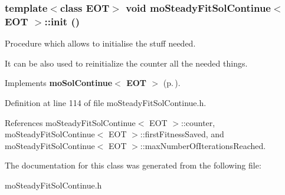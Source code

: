 \subsubsection{\setlength{\rightskip}{0pt plus 5cm}template$<$class EOT$>$ void {\bf mo\-Steady\-Fit\-Sol\-Continue}$<$ EOT $>$::init ()\hspace{0.3cm}{\tt  [inline, virtual]}}\label{classmo_steady_fit_sol_continue_a2}


Procedure which allows to initialise the stuff needed. 

It can be also used to reinitialize the counter all the needed things. 

Implements {\bf mo\-Sol\-Continue$<$ EOT $>$} {\rm (p.\,\pageref{classmo_sol_continue_a0})}.

Definition at line 114 of file mo\-Steady\-Fit\-Sol\-Continue.h.

References mo\-Steady\-Fit\-Sol\-Continue$<$ EOT $>$::counter, mo\-Steady\-Fit\-Sol\-Continue$<$ EOT $>$::first\-Fitness\-Saved, and mo\-Steady\-Fit\-Sol\-Continue$<$ EOT $>$::max\-Number\-Of\-Iterations\-Reached.

The documentation for this class was generated from the following file:\begin{CompactItemize}
\item 
mo\-Steady\-Fit\-Sol\-Continue.h\end{CompactItemize}
